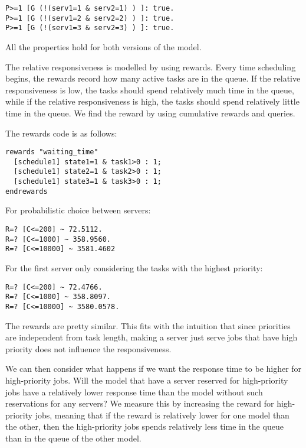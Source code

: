 \begin{verbatim}
P>=1 [G (!(serv1=1 & serv2=1) ) ]: true.
P>=1 [G (!(serv1=2 & serv2=2) ) ]: true.
P>=1 [G (!(serv1=3 & serv2=3) ) ]: true.
\end{verbatim}

All the properties hold for both versions of the model.

The relative responsiveness is modelled by using rewards.
Every time scheduling begins,
the rewards record how many active tasks are in the queue.
If the relative responsiveness is low, the tasks should spend relatively much time
in the queue, while if the relative responsiveness is high,
the tasks should spend relatively little time in the queue.
We find the reward by using cumulative rewards and queries.

The rewards code is as follows:

\begin{verbatim}
rewards "waiting_time"
  [schedule1] state1=1 & task1>0 : 1;
  [schedule1] state2=1 & task2>0 : 1;
  [schedule1] state3=1 & task3>0 : 1;
endrewards
\end{verbatim}

For probabilistic choice between servers:

\begin{verbatim}
R=? [C<=200] ~ 72.5112.
R=? [C<=1000] ~ 358.9560.
R=? [C<=10000] ~ 3581.4602
\end{verbatim}

For the first server only considering the tasks with the highest priority:

\begin{verbatim}
R=? [C<=200] ~ 72.4766.
R=? [C<=1000] ~ 358.8097.
R=? [C<=10000] ~ 3580.0578.
\end{verbatim}

The rewards are pretty similar. This fits with the intuition that since priorities
are independent from task length, making a server just serve jobs that have high priority
does not influence the responsiveness.

We can then consider what happens if we want the response time to be higher for
high-priority jobs. Will the model that have a server reserved for high-priority jobs
have a relatively lower response time than the model without such reservations for any servers?
We measure this by increasing the reward for high-priority jobs,
meaning that if the reward is relatively lower for one model than the other,
then the high-priority jobs spends relatively less time in the queue than in the queue
of the other model.

